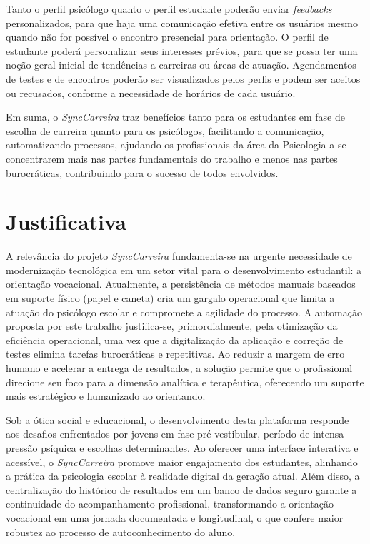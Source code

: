 Tanto o perfil psicólogo quanto o perfil estudante poderão enviar \textit{feedbacks} personalizados, para que haja uma comunicação efetiva entre os usuários mesmo quando não for possível o encontro presencial para orientação. O perfil de estudante poderá personalizar seus interesses prévios, para que se possa ter uma noção geral inicial de tendências a carreiras ou áreas de atuação. Agendamentos de testes e de encontros poderão ser visualizados pelos perfis e podem ser aceitos ou recusados, conforme a necessidade de horários de cada usuário.

Em suma, o \textit{SyncCarreira} traz benefícios tanto para os estudantes em fase de escolha de carreira quanto para os psicólogos, facilitando a comunicação, automatizando processos, ajudando os profissionais da área da Psicologia a se concentrarem mais nas partes fundamentais do trabalho e menos nas partes burocráticas, contribuindo para o sucesso de todos envolvidos.

\section{Justificativa}

A relevância do projeto \textit{SyncCarreira} fundamenta-se na urgente necessidade de modernização tecnológica em um setor vital para o desenvolvimento estudantil: a orientação vocacional. Atualmente, a persistência de métodos manuais baseados em suporte físico (papel e caneta) cria um gargalo operacional que limita a atuação do psicólogo escolar e compromete a agilidade do processo. A automação proposta por este trabalho justifica-se, primordialmente, pela otimização da eficiência operacional, uma vez que a digitalização da aplicação e correção de testes elimina tarefas burocráticas e repetitivas. Ao reduzir a margem de erro humano e acelerar a entrega de resultados, a solução permite que o profissional direcione seu foco para a dimensão analítica e terapêutica, oferecendo um suporte mais estratégico e humanizado ao orientando.

Sob a ótica social e educacional, o desenvolvimento desta plataforma responde aos desafios enfrentados por jovens em fase pré-vestibular, período de intensa pressão psíquica e escolhas determinantes. Ao oferecer uma interface interativa e acessível, o \textit{SyncCarreira} promove maior engajamento dos estudantes, alinhando a prática da psicologia escolar à realidade digital da geração atual. Além disso, a centralização do histórico de resultados em um banco de dados seguro garante a continuidade do acompanhamento profissional, transformando a orientação vocacional em uma jornada documentada e longitudinal, o que confere maior robustez ao processo de autoconhecimento do aluno.

